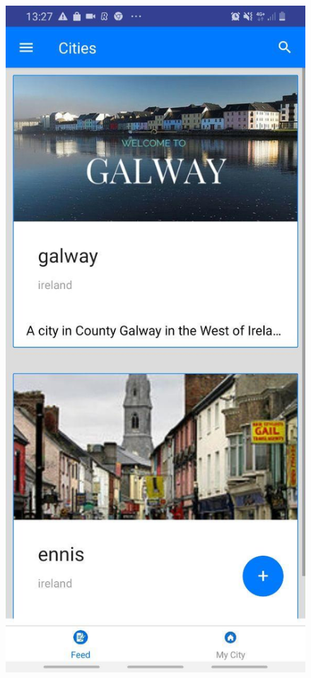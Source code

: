 \begin{figure}[h!]
\begin{minipage}[t]{0.48\textwidth}
\includegraphics[width=\linewidth,keepaspectratio=true]{img/home_page.jpg}

\end{minipage}
\end{figure}
